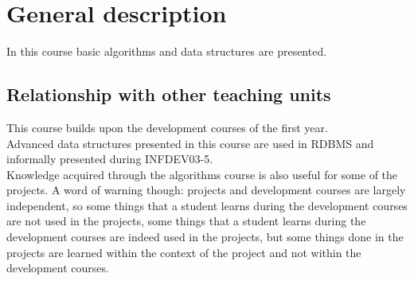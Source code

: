 \section{General description}
	In this course basic algorithms and data structures are presented. \\

	\subsection{Relationship with other teaching units}
		This course builds upon the development courses of the first year.	\\		

		Advanced data structures presented in this course are used in RDBMS and informally presented during INFDEV03-5. \\
		
		Knowledge acquired through the algorithms course is also useful for some of the projects. A word of warning though: projects and development courses are largely independent, so some things that a student learns during the development courses are not used in the projects, some things that a student learns during the development courses are indeed used in the projects, but some things done in the projects are learned within the context of the project and not within the development courses.
